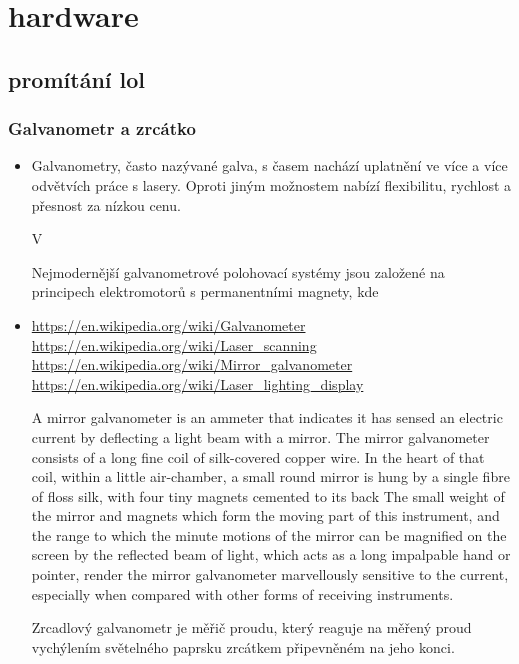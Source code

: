 \documentclass{template/socthesis}
\begin{document}
\newpage
\chapter{hardware}
\section{promítání lol}

\subsection{Galvanometr a zrcátko}
\begin{itemize}
  \item
    Galvanometry, často nazývané galva, s časem nachází uplatnění ve více a více odvětvích práce s lasery.
    Oproti jiným možnostem nabízí flexibilitu, rychlost a přesnost za nízkou cenu.

    V 

    Nejmodernější galvanometrové polohovací systémy jsou založené na principech elektromotorů s permanentními magnety, kde 
    \cite{galva}
  \item
        \url{https://en.wikipedia.org/wiki/Galvanometer}\\
        \url{https://en.wikipedia.org/wiki/Laser_scanning}\\
        \url{https://en.wikipedia.org/wiki/Mirror_galvanometer}\\
        \url{https://en.wikipedia.org/wiki/Laser_lighting_display}

        A mirror galvanometer is an ammeter that indicates it has sensed an electric current by deflecting a light beam with a mirror.
        The mirror galvanometer consists of a long fine coil of silk-covered copper wire. %
        In the heart of that coil, within a little air-chamber, a small round mirror is hung by a single fibre of floss silk, with four tiny magnets cemented to its back
        The small weight of the mirror and magnets which form the moving part of this instrument, and the range to which the minute motions of the mirror can be magnified on the screen by the reflected beam of light, which acts as a long impalpable hand or pointer, render the mirror galvanometer marvellously sensitive to the current, especially when compared with other forms of receiving instruments.

        Zrcadlový galvanometr je měřič proudu, který reaguje na měřený proud vychýlením světelného paprsku zrcátkem připevněném na jeho konci.


\end{itemize}
\end{document}
